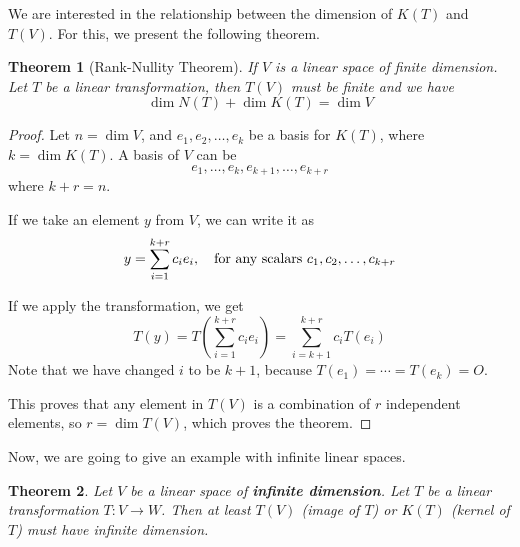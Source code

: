\documentclass{book}
\newtheorem{theorem}{Theorem}[section]
\begin{document}
We are interested in the relationship between the dimension of $K(T)$ and
$T(V)$. For this, we present the following theorem.

\begin{theorem}[Rank-Nullity Theorem]
    If $V$ is a linear space of finite dimension. Let $T$ be a linear transformation, then $T(V)$ must be finite and we have
    \begin{equation}
        \dim N(T) + \dim K(T) = \dim V
    \end{equation}
\end{theorem}

\begin{proof}
    Let $n=\dim V$, and $e_1,e_2,\dots,e_k$ be a basis for $K(T)$, where
    $k=\dim K(T)$. A basis of $V$ can be
    \begin{equation*}
        e_1,\dots,e_k,e_{k+1},\dots,e_{k+r}
    \end{equation*}
    where $k+r=n$.

    If we take an element $y$ from $V$, we can write it as
    \begin{equation*}
        y=\sum^{k+r}_{i=1}{c_i e_i}, \quad \textnormal{for any scalars } c_1,c_2,\dots,c_{k+r}
    \end{equation*}

    If we apply the transformation, we get
    \begin{equation*}
        T(y)=T\left(\sum^{k+r}_{i=1}{c_i e_i}\right) = \sum^{k+r}_{i=k+1}{c_i T(e_i)}
    \end{equation*}
    Note that we have changed $i$ to be $k+1$, because $T(e_1) = \cdots = T(e_k) = O$.

    This proves that any element in $T(V)$ is a combination of $r$ independent
    elements, so $r=\dim T(V)$, which proves the theorem.
\end{proof}

Now, we are going to give an example with infinite linear spaces.

\begin{theorem}
    Let $V$ be a linear space of \textbf{infinite dimension}.
    Let $T$ be a linear transformation $T: V\to W$. Then at least
    $T(V)$ (image of $T$) or $K(T)$ (kernel of $T$) must have infinite
    dimension.
\end{theorem}
\end{document}
